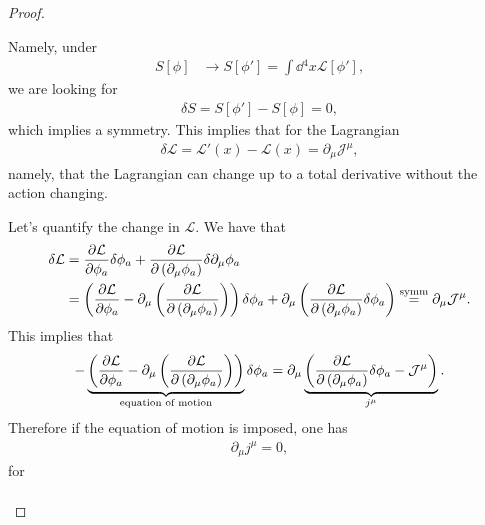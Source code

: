\begin{proof}
\begin{enumerate}[label=\arabic*)]
\begin{definition}
                Namely, under
                \begin{align}
                    S \left[ \phi \right] &\to S \left[ \phi' \right] = \int \dd{^{4}x} \mathcal{L}\left[ \phi' \right] 
                ,\end{align}
                we are looking for
                \begin{align}
                    \delta S = S \left[ \phi' \right] - S \left[ \phi \right] = 0
                ,\end{align}
                which implies a symmetry. This implies that for the Lagrangian
                \begin{align}
                    \delta \mathcal{L} = \mathcal{L}'\left( x \right) - \mathcal{L}\left( x \right) = \partial_\mu \mathcal{J}^{\mu}
                ,\end{align}
                namely, that the Lagrangian can change up to a total derivative without the action changing.
            \end{definition}
            Let's quantify the change in $\mathcal{L}$. We have that
            \begin{align}
                \delta \mathcal{L} &= \pdv{\mathcal{L}}{\phi_a} \delta \phi_a + \pdv{\mathcal{L}}{\left( \partial_\mu \phi_a \right) } \delta \partial_\mu \phi_a \\
                &= \left( \pdv{\mathcal{L}}{\phi_a} - \partial_\mu \left( \pdv{\mathcal{L}}{\left( \partial_\mu \phi_a \right) } \right)  \right) \delta \phi_a +\partial_\mu \left( \pdv{\mathcal{L}}{\left( \partial_\mu \phi_a \right) } \delta \phi_a \right)  \overset{\text{symm}}{=} \partial_\mu \mathcal{J}^{\mu}
            .\end{align}
            This implies that
            \begin{align}
                - \underbrace{\left( \pdv{\mathcal{L}}{\phi_a} - \partial_\mu \left( \pdv{\mathcal{L}}{\left( \partial_\mu \phi_a \right) } \right)  \right)}_{\text{equation of motion}} \delta \phi_a = \partial_\mu \underbrace{\left( \pdv{\mathcal{L}}{\left( \partial_\mu \phi_a \right)}\delta \phi_a - \mathcal{J}^{\mu}   \right)}_{j^{\mu}} 
            .\end{align}
            Therefore if the equation of motion is imposed, one has
            \begin{align}
                \partial_\mu j^{\mu} = 0
            ,\end{align}
            for
            \begin{align}

\end{align}
\end{enumerate}
\end{proof}
